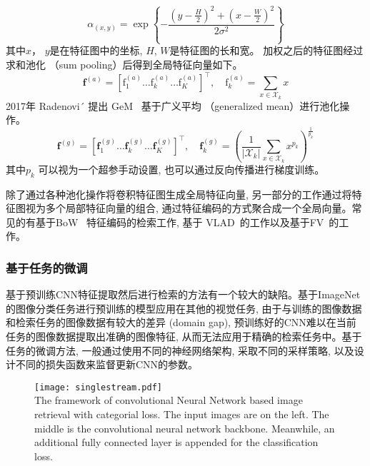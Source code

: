 \begin{equation}
    \alpha_{(x, y)}=\exp \left\{-\frac{\left(y-\frac{H}{2}\right)^2+\left(x-\frac{W}{2}\right)^2}{2 \sigma^2}\right\}
    \label{eq:gaussianweight}
\end{equation}
其中$x$， $y$是在特征图中的坐标, $H$, $W$是特征图的长和宽。 加权之后的特征图经过求和池化 （sum pooling）后得到全局特征向量如下。
\begin{equation}
    \mathbf{f}^{(a)}=\left[\mathrm{f}_1^{(a)} \ldots \mathrm{f}_k^{(a)} \ldots \mathrm{f}_K^{(a)}\right]^{\top}, \quad \mathrm{f}_k^{(a)}= \sum_{x \in \mathcal{X}_k} x
\end{equation}
2017年 Radenovi´ 提出 GeM~\cite{radenovic2018fine} 基于广义平均 （generalized mean）进行池化操作。
\begin{equation}
    \mathbf{f}^{(g)}=\left[\mathbf{f}_1^{(g)} \ldots \mathbf{f}_k^{(g)} \ldots \mathbf{f}_K^{(g)}\right]^{\top}, \quad \mathbf{f}_k^{(g)}=\left(\frac{1}{\left|\mathcal{X}_k\right|} \sum_{x \in \mathcal{X}_k} x^{p_k}\right)^{\frac{1}{p_k}}
\end{equation}
其中$p_k$ 可以视为一个超参手动设置, 也可以通过反向传播进行梯度训练。\par
除了通过各种池化操作将卷积特征图生成全局特征向量, 另一部分的工作通过将特征图视为多个局部特征向量的组合, 通过特征编码的方式聚合成一个全局向量。常见的有基于BoW ~\cite{li2016exploiting, mohedano2016bags, zheng2016accurate}特征编码的检索工作, 基于 VLAD~\cite{gong2014multi, yue2015exploiting}的工作以及基于FV~\cite{jegou2011aggregating, sanchez2013image}的工作。 

\subsubsection{基于任务的微调}
基于预训练CNN特征提取然后进行检索的方法有一个较大的缺陷。基于ImageNet的图像分类任务进行预训练的模型应用在其他的视觉任务, 由于与训练的图像数据和检索任务的图像数据有较大的差异 (domain gap), 预训练好的CNN难以在当前任务的图像数据提取出准确的图像特征, 从而无法应用于精确的检索任务中。基于任务的微调方法, 一般通过使用不同的神经网络架构, 采取不同的采样策略, 以及设计不同的损失函数来监督更新CNN的参数。
\begin{figure}[!htp]
    \centering
    \texttt{[image: singlestream.pdf]} \\
      {The framework of convolutional Neural Network based image retrieval with categorial loss. The input images are on the left. The middle is the convolutional neural network backbone. Meanwhile, an additional fully connected layer is appended for the classification loss.  }
   \label{fig:featurestream}
\end{figure}


